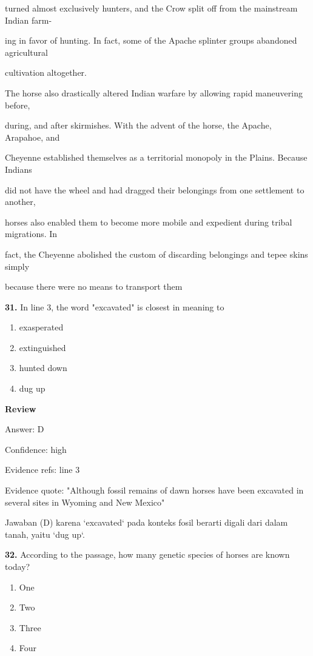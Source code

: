 \documentclass[12pt]{article}
\begin{document}
turned almost exclusively hunters, and the Crow split off from the mainstream Indian farm-\par
ing in favor of hunting. In fact, some of the Apache splinter groups abandoned agricultural\par
cultivation altogether.\par
The horse also drastically altered Indian warfare by allowing rapid maneuvering before,\par
during, and after skirmishes. With the advent of the horse, the Apache, Arapahoe, and\par
Cheyenne established themselves as a territorial monopoly in the Plains. Because Indians\par
did not have the wheel and had dragged their belongings from one settlement to another,\par
horses also enabled them to become more mobile and expedient during tribal migrations. In\par
fact, the Cheyenne abolished the custom of discarding belongings and tepee skins simply\par
because there were no means to transport them\par
\endgroup
\medskip
\noindent\textbf{31.} In line 3, the word "excavated" is closest in meaning to
\begin{enumerate}[label=(\Alph*),leftmargin=*,itemsep=0.2em]
\item exasperated
\item extinguished
\item hunted down
\item dug up
\end{enumerate}
\par
\begingroup
\setlength{\parskip}{0pt}
\setlength{\parindent}{0pt}
\textbf{Review}\par
Answer: D\par
Confidence: high\par
Evidence refs: line 3\par
Evidence quote: "Although fossil remains of dawn horses have been excavated in several sites in Wyoming and New Mexico"\par
Jawaban (D) karena `excavated` pada konteks fosil berarti digali dari dalam tanah, yaitu `dug up`.\par
\endgroup
\par
\vspace{0.25\baselineskip}
\noindent\textbf{32.} According to the passage, how many genetic species of horses are known today?
\begin{enumerate}[label=(\Alph*),leftmargin=*,itemsep=0.2em]
\item One
\item Two
\item Three
\item Four
\end{enumerate}
\end{document}
